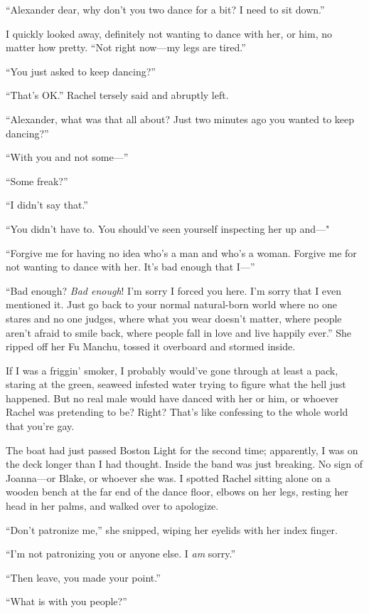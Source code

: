 ``Alexander dear, why don't you two dance for a bit? I need to sit
down.''

I quickly looked away, definitely not wanting to dance with her, or him,
no matter how pretty. ``Not right now---my legs are tired.''

``You just asked to keep dancing?''

``That's OK.'' Rachel tersely said and abruptly left.

``Alexander, what was that all about? Just two minutes ago you wanted to
keep dancing?''

``With you and not some---''

``Some freak?''

``I didn't say that.''

``You didn't have to. You should've seen yourself inspecting her up
and---"

``Forgive me for having no idea who's a man and who's a woman. Forgive
me for not wanting to dance with her. It's bad enough that I---''

``Bad enough? \emph{Bad enough}! I'm sorry I forced you here. I'm sorry
that I even mentioned it. Just go back to your normal natural-born world
where no one stares and no one judges, where what you wear doesn't
matter, where people aren't afraid to smile back, where people fall in
love and live happily ever.'' She ripped off her Fu Manchu, tossed it
overboard and stormed inside.

If I was a friggin' smoker, I probably would've gone through at least a
pack, staring at the green, seaweed infested water trying to figure what
the hell just happened. But no real male would have danced with her or
him, or whoever Rachel was pretending to be? Right? That's like
confessing to the whole world that you're gay.

The boat had just passed Boston Light for the second time; apparently, I
was on the deck longer than I had thought. Inside the band was just
breaking. No sign of Joanna---or Blake, or whoever she was. I spotted
Rachel sitting alone on a wooden bench at the far end of the dance
floor, elbows on her legs, resting her head in her palms, and walked
over to apologize.

``Don't patronize me,'' she snipped, wiping her eyelids with her index
finger.

``I'm not patronizing you or anyone else. I \emph{am} sorry.''

``Then leave, you made your point.''

``What is with you people?''


